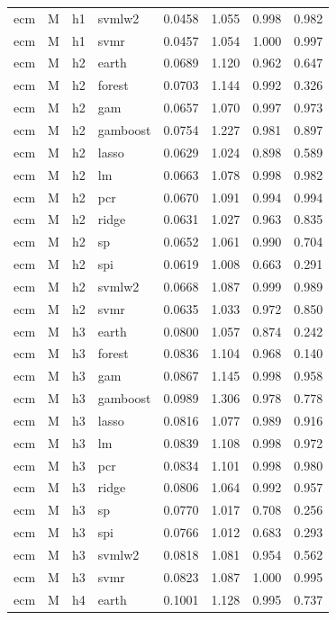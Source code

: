 \begin{ThreePartTable}
\begin{longtable}[t]{llclcccc}
ecm & M & h1 & svmlw2 & 0.0458 & 1.055 & 0.998 & 0.982\\
ecm & M & h1 & svmr & 0.0457 & 1.054 & 1.000 & 0.997\\
\addlinespace
ecm & M & h2 & earth & 0.0689 & 1.120 & 0.962 & 0.647\\
ecm & M & h2 & forest & 0.0703 & 1.144 & 0.992 & 0.326\\
ecm & M & h2 & gam & 0.0657 & 1.070 & 0.997 & 0.973\\
ecm & M & h2 & gamboost & 0.0754 & 1.227 & 0.981 & 0.897\\
ecm & M & h2 & lasso & 0.0629 & 1.024 & 0.898 & 0.589\\
ecm & M & h2 & lm & 0.0663 & 1.078 & 0.998 & 0.982\\
ecm & M & h2 & pcr & 0.0670 & 1.091 & 0.994 & 0.994\\
ecm & M & h2 & ridge & 0.0631 & 1.027 & 0.963 & 0.835\\
ecm & M & h2 & sp & 0.0652 & 1.061 & 0.990 & 0.704\\
ecm & M & h2 & spi & 0.0619 & 1.008 & 0.663 & 0.291\\
ecm & M & h2 & svmlw2 & 0.0668 & 1.087 & 0.999 & 0.989\\
ecm & M & h2 & svmr & 0.0635 & 1.033 & 0.972 & 0.850\\
\addlinespace
ecm & M & h3 & earth & 0.0800 & 1.057 & 0.874 & 0.242\\
ecm & M & h3 & forest & 0.0836 & 1.104 & 0.968 & 0.140\\
ecm & M & h3 & gam & 0.0867 & 1.145 & 0.998 & 0.958\\
ecm & M & h3 & gamboost & 0.0989 & 1.306 & 0.978 & 0.778\\
ecm & M & h3 & lasso & 0.0816 & 1.077 & 0.989 & 0.916\\
ecm & M & h3 & lm & 0.0839 & 1.108 & 0.998 & 0.972\\
ecm & M & h3 & pcr & 0.0834 & 1.101 & 0.998 & 0.980\\
ecm & M & h3 & ridge & 0.0806 & 1.064 & 0.992 & 0.957\\
ecm & M & h3 & sp & 0.0770 & 1.017 & 0.708 & 0.256\\
ecm & M & h3 & spi & 0.0766 & 1.012 & 0.683 & 0.293\\
ecm & M & h3 & svmlw2 & 0.0818 & 1.081 & 0.954 & 0.562\\
ecm & M & h3 & svmr & 0.0823 & 1.087 & 1.000 & 0.995\\
\addlinespace
ecm & M & h4 & earth & 0.1001 & 1.128 & 0.995 & 0.737\\

\end{longtable}
\end{ThreePartTable}
